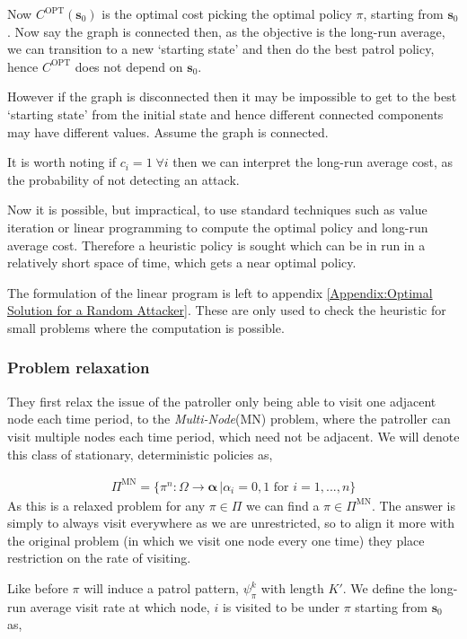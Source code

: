 \documentclass[a4paper,10pt]{article}
\theoremstyle{definition}
\theoremstyle{definition}
\theoremstyle{remark}
\theoremstyle{definition}
\begin{document}
Now $C^{\text{OPT}}(\bm{s}_{0})$ is the optimal cost picking the optimal policy $\pi$, starting from $\bm{s}_{0}$. Now say the graph is connected then, as the objective is the long-run average, we can transition to a new `starting state' and then do the best patrol policy, hence $C^{\text{OPT}}$ does not depend on $\bm{s}_{0}$.

However if the graph is disconnected then it may be impossible to get to the best `starting state' from the initial state and hence different connected components may have different values. Assume the graph is connected.

It is worth noting if $c_{i}=1 \; \forall i$ then we can interpret the long-run average cost, as the probability of not detecting an attack.

Now it is possible, but impractical, to use standard techniques such as value iteration or linear programming to compute the optimal policy and long-run average cost. Therefore a heuristic policy is sought which can be in run in a relatively short space of time, which gets a near optimal policy.

The formulation of the linear program is left to appendix \ref{Appendix:Optimal Solution for a Random Attacker}. These are only used to check the heuristic for small problems where the computation is possible.


\subsubsection{Problem relaxation}
They first relax the issue of the patroller only being able to visit one adjacent node each time period, to the \textit{Multi-Node}(MN) problem, where the patroller can visit multiple nodes each time period, which need not be adjacent. We will denote this class of stationary, deterministic policies as,

\begin{align*}
\Pi^{\text{MN}}=\{\pi^{n}: \Omega \rightarrow \bm{\alpha} \, | \alpha_{i}=0,1 \text{ for } i=1,...,n \}
\end{align*}
As this is a relaxed problem for any $\pi \in \Pi$ we can find a $\pi \in \Pi^{\text{MN}}$. The answer is simply to always visit everywhere as we are unrestricted, so to align it more with the original problem (in which we visit one node every one time) they place restriction on the rate of visiting.

Like before $\pi$ will induce a patrol pattern, $\psi^{k}_{\pi}$ with length $K'$. We define the long-run average visit rate at which node, $i$ is visited to be under $\pi$ starting from $\bm{s}_{0}$ as,
\end{document}
